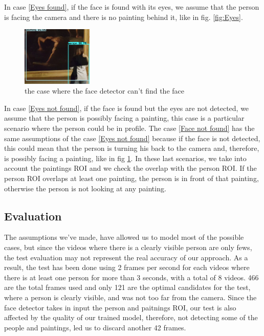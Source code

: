 In case \ref*{Eyes found}, if the face is found with its eyes, we assume that the person is facing the camera and there is no painting behind it, like in fig. \ref{fig:Eyes}.
\begin{figure}
    \centering
        \includegraphics[width=0.3\textwidth]{pictures/face_detection/face_det1}
    \caption{the case where the face detector can't find the face}
    \label{fig:No_eyes}
\end{figure}
In case \ref*{Eyes not found}, if the face is found but the eyes are not detected, we assume that the person is possibly facing a painting, this case is a particular scenario where the person could be in profile. The case \ref*{Face not found} has the same assumptions of the case \ref*{Eyes not found} because if the face is not detected, this could mean that the person is turning his back to the camera and, therefore, is possibly facing a painting, like in fig \ref{fig:No_eyes}. In these last scenarios, we take into account the paintings ROI and we check the overlap with the person ROI. If the person ROI overlaps at least one painting, the person is in front of that painting, otherwise the person is not looking at any painting.

\subsection{Evaluation}
The assumptions we've made, have allowed us to model most of the possible cases, but since the videos where there is a clearly visible person are only fews, the test evaluation may not represent the real accuracy of our approach. As a result, the test has been done using 2 frames per second for each videos where there is at least one person for more than 3 seconds, with a total of 8 videos. 466 are the total frames used and only 121 are the optimal candidates for the test, where a person is clearly visible, and was not too far from the camera. Since the face detector takes in input the person and paitnings ROI, our test is also affected by the quality of our trained model, therefore, not detecting some of the people and paintings, led us to discard another 42 frames.

